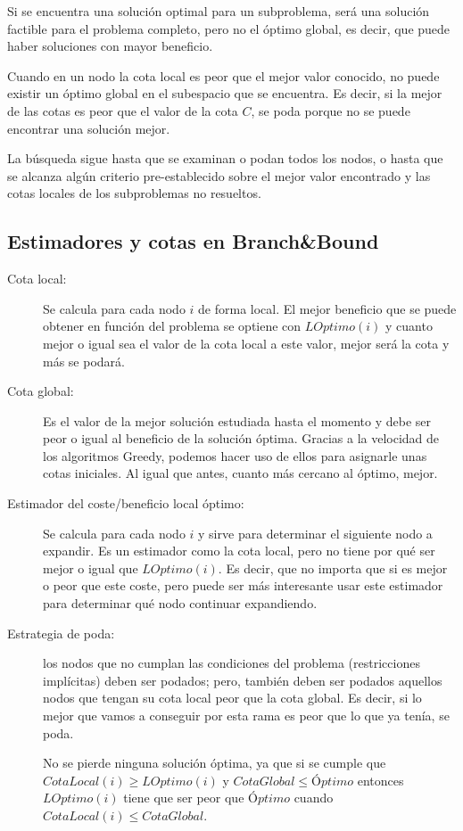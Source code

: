 \documentclass[10pt,a4paper,spanish]{report}
\theoremstyle{definition}
\theoremstyle{remark}
\begin{document}
Si se encuentra una solución optimal para un subproblema, será una solución factible para el problema completo, pero no el óptimo global, es decir, que puede haber soluciones con mayor beneficio.

Cuando en un nodo la cota local es peor que el mejor valor conocido, no puede existir un óptimo global en el subespacio que se encuentra. Es decir, si la mejor de las cotas es peor que el valor de la cota $C$, se poda porque no se puede encontrar una solución mejor.

La búsqueda sigue hasta que se examinan o podan todos los nodos, o hasta que se alcanza algún criterio pre-establecido sobre el mejor valor encontrado y las cotas locales de los subproblemas no resueltos.

\subsection{\textcolor{coquelicot}Estimadores y cotas en Branch\&Bound}

\begin{description}
    \item [Cota local:] Se calcula para cada nodo $i$ de forma local. El mejor beneficio que se puede obtener en función del problema se optiene con $LOptimo(i)$ y cuanto mejor o igual sea el valor de la cota local a este valor, mejor será la cota y más se podará.

    \item [Cota global:] Es el valor de la mejor solución estudiada hasta el momento y debe ser peor o igual al beneficio de la solución óptima. Gracias a la velocidad de los algoritmos Greedy, podemos hacer uso de ellos para asignarle unas cotas iniciales. Al igual que antes, cuanto más cercano al óptimo, mejor.

    \item [Estimador del coste/beneficio local óptimo:] Se calcula para cada nodo $i$ y sirve para determinar el siguiente nodo a expandir. Es un estimador como la cota local, pero no tiene por qué ser mejor o igual que $LOptimo(i)$. Es decir, que no importa que si es mejor o peor que este coste, pero puede ser más interesante usar este estimador para determinar qué nodo continuar expandiendo.

    \item [Estrategia de poda:] los nodos que no cumplan las condiciones del problema (restricciones implícitas) deben ser podados; pero, también deben ser podados aquellos nodos que tengan su cota local peor que la cota global. Es decir, si lo mejor que vamos a conseguir por esta rama es peor que lo que ya tenía, se poda.

    No se pierde ninguna solución óptima, ya que si se cumple que $CotaLocal(i) \ge LOptimo(i)$ y $CotaGlobal \leq Óptimo$ entonces $LOptimo(i)$ tiene que ser peor que $Óptimo$ cuando $CotaLocal(i) \leq CotaGlobal$.
\end{description} 
\end{document}
